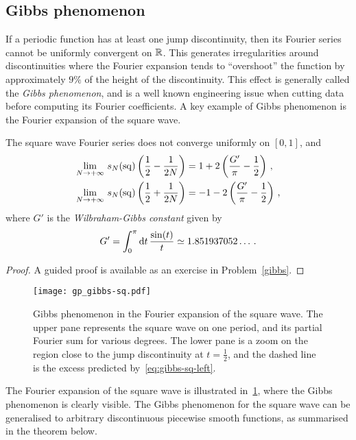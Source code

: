 \subsection{Gibbs phenomenon}
If a periodic function has at least one jump discontinuity, then its Fourier series cannot
be uniformly convergent on $\mathbb{R}$. This generates irregularities around
discontinuities where the Fourier expansion tends to ``overshoot'' the function by
approximately $9\%$ of the height of the discontinuity. This effect is generally called
the \emph{Gibbs phenomenon}, and is a well known engineering issue when cutting data
before computing its Fourier coefficients. A key example of Gibbs phenomenon is the
Fourier expansion of the square wave.
\begin{lemma}
  \label{lem:gibbs-sq}
  The square wave Fourier series does not converge uniformly on $[0,1]$, and
  \begin{align}
    \lim_{N\to+\infty}\,s_N(\operatorname{sq})\left(\frac12-\frac{1}{2N}\right)
    &=1+2\left(\frac{G'}{\pi}-\frac12\right)\,,\label{eq:gibbs-sq-left}\\
    \lim_{N\to+\infty}\,s_N(\operatorname{sq})\left(\frac12+\frac{1}{2N}\right)
    &=-1-2\left(\frac{G'}{\pi}-\frac12\right)\,,\label{eq:gibbs-sq-right}
  \end{align}
  where $G'$ is the \emph{Wilbraham-Gibbs constant} given by
  \begin{equation}
    G'=\int_0^\pi\mathrm{d} t\,\frac{\sin(t)}{t}\simeq1.851937052\dots\,.
  \end{equation}
\end{lemma}
\begin{proof}
  A guided proof is available as an exercise in Problem~\ref{gibbs}.
\end{proof}
\begin{figure}[t]
  \centering
  \texttt{[image: gp\_gibbs-sq.pdf]}
  \caption{Gibbs phenomenon in the Fourier expansion of the square wave. The upper pane
    represents the square wave on one period, and its partial Fourier sum for various
    degrees. The lower pane is a zoom on the region close to the jump discontinuity at
  $t=\frac12$, and the dashed line is the excess predicted by~\cref{eq:gibbs-sq-left}.}
  \label{fig:gibbs-sq}
\end{figure}
The Fourier expansion of the square wave is illustrated in~\cref{fig:gibbs-sq}, where the
Gibbs phenomenon is clearly visible. The Gibbs phenomenon for the square wave can be
generalised to arbitrary discontinuous piecewise smooth functions, as summarised in the
theorem below.
